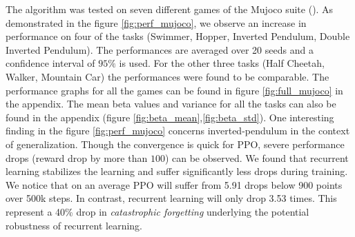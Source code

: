The algorithm was tested on seven different games of the Mujoco suite (\cite{todorov2012mujoco}). As demonstrated in the figure \ref{fig:perf_mujoco}, we observe an increase in performance on four of the tasks (Swimmer, Hopper, Inverted Pendulum, Double Inverted Pendulum). The performances are averaged over 20 seeds and a confidence interval of $95\%$ is used. For the other three tasks (Half Cheetah, Walker, Mountain Car) the performances were found to be comparable. The performance graphs for all the games can be found in figure \ref{fig:full_mujoco} in the appendix. The mean beta values and variance for all the tasks can also be found in the appendix (figure \ref{fig:beta_mean},\ref{fig:beta_std}).
One interesting finding in the figure \ref{fig:perf_mujoco} concerns inverted-pendulum in the context of generalization. Though the convergence is quick for PPO, severe performance drops (reward drop by more than $100$) can be observed. We found that recurrent learning stabilizes the learning and suffer significantly less drops during training. We notice that on an average PPO will suffer from 5.91 drops below 900 points over 500k steps. In contrast, recurrent learning will only drop 3.53 times. This represent a 40\% drop in \emph{catastrophic forgetting} underlying the potential robustness of recurrent learning.

